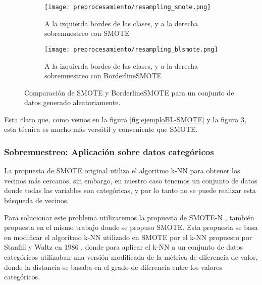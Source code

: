 \begin{figure}[H]
    \centering
	 \begin{subfigure}[b]{\textwidth}
		 \centering
		 \texttt{[image: preprocesamiento/resampling\_smote.png]}
		 \caption{A la izquierda bordes de las clases, y a la derecha sobremuestreo con SMOTE}
		 \label{fig:SMOTE-cmp}
	 \end{subfigure}

    \begin{subfigure}[b]{\textwidth}
		 \centering
		  \texttt{[image: preprocesamiento/resampling\_blsmote.png]}
        \caption{A la izquierda bordes de las clases, y a la derecha sobremuestreo con BorderlineSMOTE}
        \label{fig:BLSMOTE-cmp}
    \end{subfigure}

    \caption{Comparación de SMOTE y BorderlineSMOTE para un conjunto de datos generado aleatoriamente.}\label{fig:BLSMOTE-SMOTE}

\end{figure}

Esta claro que, como vemos en la figura \ref{fig:ejemploBL-SMOTE} y la figura \ref{fig:BLSMOTE-SMOTE}, esta técnica es mucho más versátil y conveniente que SMOTE.


\subsubsection{Sobremuestreo: Aplicación sobre datos categóricos}

La propuesta de SMOTE original utiliza el algoritmo k-NN para obtener los vecinos más cercanos, sin embargo, en nuestro caso tenemos un conjunto de datos donde todas las variables son categóricas, y por lo tanto no se puede realizar esta búsqueda de vecinos.

Para solucionar este problema utilizaremos la propuesta de SMOTE-N \cite{SMOTE}, también propuesta en el mismo trabajo donde se propuso SMOTE. Esta propuesta se basa en modificar el algoritmo k-NN utilizado en SMOTE por el k-NN propuesto por Stanfill y Waltz en 1986 \cite{kNNSMOTEN}, donde para aplicar el k-NN a un conjunto de datos categóricos utilizaban una versión modificada de la métrica de diferencia de valor, donde la distancia se basaba en el grado de diferencia entre los valores categóricos.

